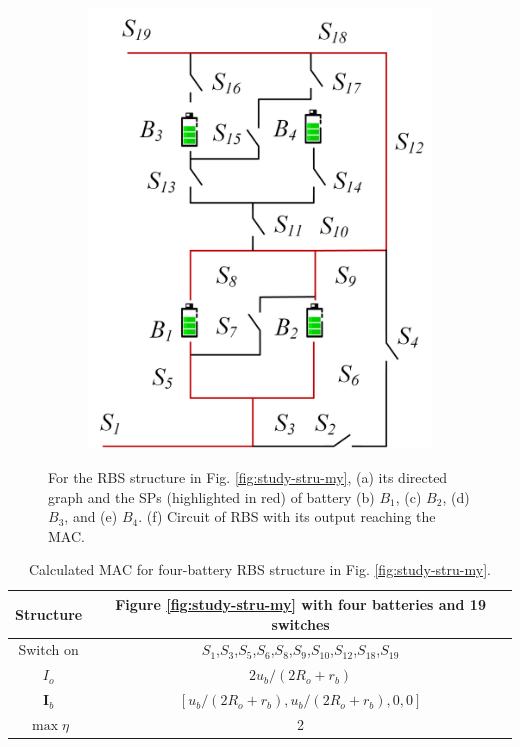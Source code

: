 \documentclass{article}
\begin{document}
\begin{figure}[htbp]
\begin{subfigure}[b]{0.28\textwidth}
        \includegraphics[width=\textwidth]{ef-mac.png}
        \caption{}
        \label{fig:study-results-my}
    \end{subfigure}
    \caption{
        For the RBS structure in Fig. \ref{fig:study-stru-my}, 
        (a) its directed graph 
        and the SPs (highlighted in red) of battery (b) $B_1$, (c) $B_2$, (d) $B_3$, and (e) $B_4$.
        (f) Circuit of RBS with its output reaching the MAC.
        }
    \label{fig:all-results-my}
\end{figure}

\begin{table}[htbp]
  \centering
    \caption{Calculated MAC for four-battery RBS structure in Fig. \ref{fig:study-stru-my}.}
    \begin{tabular}{cc}
    \toprule
        Structure & Figure \ref{fig:study-stru-my} with four batteries and 19 switches  \\
    \midrule
    Switch on & $S_1$,$S_3$,$S_5$,$S_6$,$S_8$,$S_9$,$S_{10}$,$S_{12}$,$S_{18}$,$S_{19}$ \\
    $I_o$ & $2u_b/(2R_o+r_b)$ \\
    $\bm{I}_b$ & $[u_b/(2R_o+r_b),u_b/(2R_o+r_b),0,0]$ \\
    $\max \eta$     & 2 \\
    \bottomrule
    \end{tabular}
  \label{tab:study-results-my}
\end{table}
\end{document}
